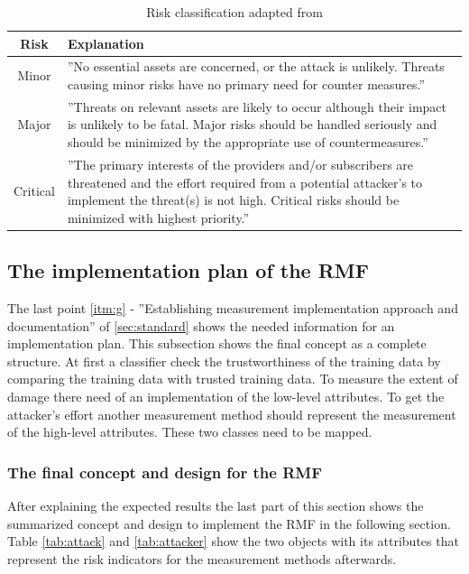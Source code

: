 \begin{table}[h]
\centering
  \begin{tabular}{|c|p{10cm}|}
  \hline
  \rowcolor{lightgray} Risk & Explanation \\
  \hline
  Minor & ''No essential assets are concerned, or the attack is unlikely. Threats causing minor risks have no
primary need for counter measures.''  \\
  \hline
  Major & ''Threats on relevant assets are likely to occur although their impact is unlikely to be fatal. Major
risks should be handled seriously and should be minimized by the appropriate use of
countermeasures.'' \\
  \hline
  Critical & ''The primary interests of the providers and/or subscribers are threatened and the effort required
from a potential attacker's to implement the threat(s) is not high. Critical risks should be
minimized with highest priority.'' \\
  \hline
  \end{tabular}
\caption{Risk classification adapted from \cite{applications_2022}}
\label{tab:risk_classify}
\end{table}

\subsection{The implementation plan of the RMF}
\label{sec:final_design}

The last point \ref{itm:g} - ''Establishing measurement implementation approach and documentation'' of \ref{sec:standard} shows the needed information for an implementation plan. This subsection shows the final concept as a complete structure. At first a classifier check the trustworthiness of the training data by comparing the training data with trusted training data. To measure the extent of damage there need of an implementation of the low-level attributes. To get the attacker's effort another measurement method should represent the measurement of the high-level attributes. These two classes need to be mapped.

\subsubsection*{The final concept and design for the RMF}

After explaining the expected results the last part of this section shows the summarized concept and design to implement the RMF in the following section. Table \ref{tab:attack} and \ref{tab:attacker} show the two objects with its attributes that represent the risk indicators for the measurement methods afterwards.

